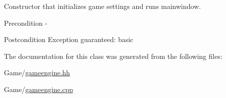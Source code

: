 Constructor that initializes game settings and runs mainwindow. 

\begin{DoxyPrecond}{Precondition}
-\/ 
\end{DoxyPrecond}
\begin{DoxyPostcond}{Postcondition}
Exception guaranteed\-: basic 
\end{DoxyPostcond}


The documentation for this class was generated from the following files\-:\begin{DoxyCompactItemize}
\item 
Game/\hyperlink{gameengine_8hh}{gameengine.\-hh}\item 
Game/\hyperlink{gameengine_8cpp}{gameengine.\-cpp}\end{DoxyCompactItemize}
